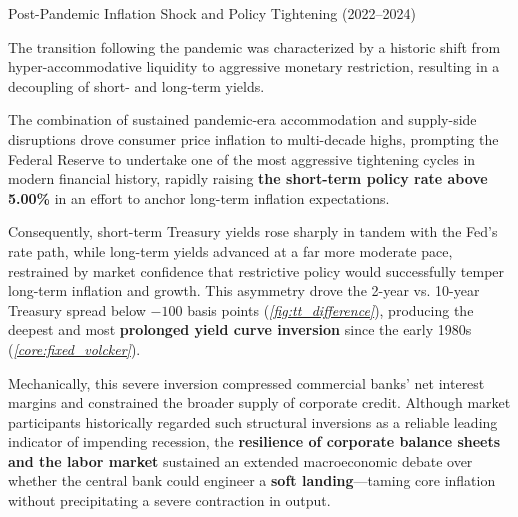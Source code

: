 \documentclass[10pt]{article}
\begin{document}
    \begin{core}{Post-Pandemic Inflation Shock and Policy Tightening (2022--2024)}

      The transition following the pandemic was characterized by a historic shift from hyper-accommodative liquidity to aggressive monetary restriction, resulting in a decoupling of short- and long-term yields.

      The combination of sustained pandemic-era accommodation and supply-side disruptions drove consumer price inflation to multi-decade highs, prompting the Federal Reserve to undertake one of the most aggressive tightening cycles in modern financial history, rapidly raising \textbf{the short-term policy rate above 5.00\%} in an effort to anchor long-term inflation expectations.

      Consequently, short-term Treasury yields rose sharply in tandem with the Fed's rate path, while long-term yields advanced at a far more moderate pace, restrained by market confidence that restrictive policy would successfully temper long-term inflation and growth. This asymmetry drove the 2-year vs. 10-year Treasury spread below $-100$ basis points (\textit{\autoref{fig:tt_difference}}), producing the deepest and most \textbf{prolonged yield curve inversion} since the early 1980s (\textit{\autoref{core:fixed_volcker}}).

      Mechanically, this severe inversion compressed commercial banks' net interest margins and constrained the broader supply of corporate credit. Although market participants historically regarded such structural inversions as a reliable leading indicator of impending recession, the \textbf{resilience of corporate balance sheets and the labor market} sustained an extended macroeconomic debate over whether the central bank could engineer a \textbf{soft landing}---taming core inflation without precipitating a severe contraction in output.


    \end{core}
\end{document}
